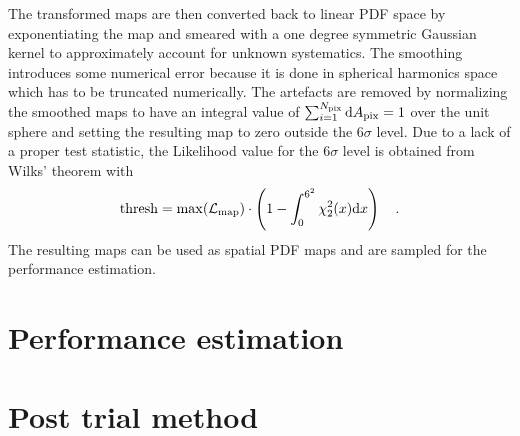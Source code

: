 The transformed maps are then converted back to linear PDF space by exponentiating the map and smeared with a one degree symmetric Gaussian kernel to approximately account for unknown systematics.
The smoothing introduces some numerical error because it is done in spherical harmonics space which has to be truncated numerically.
The artefacts are removed by normalizing the smoothed maps to have an integral value of $\sum_{i=1}^{N_\text{pix}} \mathrm{d}A_\text{pix} = 1$ over the unit sphere and setting the resulting map to zero outside the $6\sigma$ level.
Due to a lack of a proper test statistic, the Likelihood value for the $6\sigma$ level is obtained from Wilks' theorem with
\begin{equation}
  \text{thresh} =
    \max(\mathcal{L}_\text{map})\cdot
    \left(1 - \int_0^{6^2}\chi^2_{2}(x)\mathrm{d}x\right)
  \quad\text{.}
\end{equation}
The resulting maps can be used as spatial PDF maps and are sampled for the performance estimation.


\section{Performance estimation}


\section{Post trial method}

